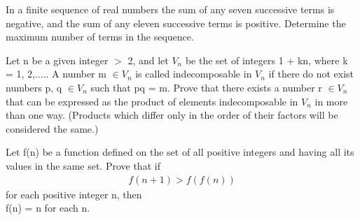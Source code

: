 \item In a finite sequence of real numbers the sum of any seven successive terms is
negative, and the sum of any eleven successive terms is positive. Determine
the maximum number of terms in the sequence.
\item Let n be a given integer $>$ 2, and let $V_n$ be the set of integers 1 + kn, where
k = 1, 2,..... A number m $\in V_n$ is called indecomposable in $V_n$ if there do not exist numbers p, q $\in V_n$ such that pq = m. Prove that there exists a number r $\in V_n$ that can be expressed as the product of elements indecomposable in $V_n$ in more than one way. (Products which differ only in the order of their factors will be considered the same.)\\

\item Let f(n) be a function defined on the set of all positive integers and having all its values in the same set. Prove that if
\begin{align*}
f(n + 1) > f(f(n))
\end{align*}
for each positive integer n, then\\
f(n) = n for each n.

